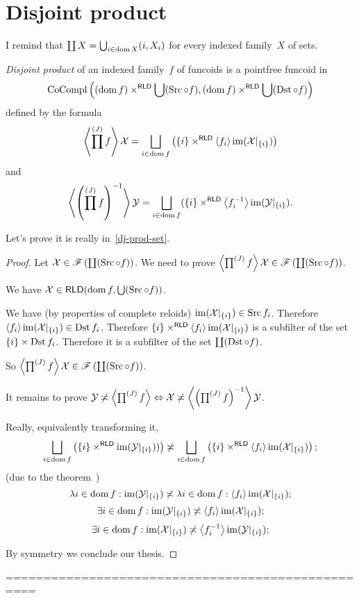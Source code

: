 \chapter{Disjoint product}

I remind that
$\coprod X = \bigcup_{i\in\operatorname{dom} X} (i,X_i)$
for every indexed family~$X$ of sets.

\begin{defn}
\emph{Disjoint product} of an indexed family~$f$ of funcoids is
a pointfree funcoid in
\begin{equation}\label{dj-prod-set}
\operatorname{CoCompl}\left((\operatorname{dom} f)\times^{\mathsf{RLD}}\bigcup(\operatorname{Src}\circ f), (\operatorname{dom} f)\times^{\mathsf{RLD}}\bigcup(\operatorname{Dst}\circ f)\right)
\end{equation}
defined by the formula
\[
\supfun{\prod^{(J)}f} \mathcal{X} =
\bigsqcup_{i\in\dom f}
\left(\{i\}\times^{\mathsf{RLD}}\supfun{f_i}\im(\mathcal{X}|_{\{i\}})\right)
\]
and
\[
\supfun{\left(\prod^{(J)}f\right)^{-1}} \mathcal{Y} =
\bigsqcup_{i\in\dom f}
(\{i\}\times^{\mathsf{RLD}}\supfun{f_i^{-1}}\im(\mathcal{Y}|_{\{i\}}).
\]
\end{defn}

Let's prove it is really in~\eqref{dj-prod-set}.

\begin{proof}
Let $\mathcal{X}\in\mathscr{F}\left(\coprod(\operatorname{Src}\circ f)\right)$.
We need to prove
$\left\langle \prod^{(J)}f\right\rangle \mathcal{X}\in\mathscr{F}\left(\coprod(\operatorname{Src}\circ f)\right)$.

We have $\mathcal{X}\in\mathsf{RLD}(\operatorname{dom} f, \bigcup(\operatorname{Src}\circ f))$.

We have (by properties of complete reloids) $\operatorname{im}(\mathcal{X}|_{\{i\}})\in\operatorname{Src} f_i$. Therefore $\left\langle f_i\right\rangle\operatorname{im}(\mathcal{X}|_{\{i\}})\in\operatorname{Dst} f_i$. Therefore
$\{i\}\times^{\mathsf{RLD}}\left\langle f_i\right\rangle\operatorname{im}(\mathcal{X}|_{\{i\}})$ is a subfilter of the set $\{i\}\times\operatorname{Dst} f_i$. Therefore it is a subfilter of the set $\coprod(\operatorname{Dst}\circ f)$.

So $\left\langle \prod^{(J)}f\right\rangle \mathcal{X}\in\mathscr{F}\left(\coprod(\operatorname{Src}\circ f)\right)$.

It remains to prove
$\mathcal{Y}\not\asymp\left\langle \prod^{(J)}f\right\rangle \Leftrightarrow
\mathcal{X}\not\asymp\left\langle \left(\prod^{(J)}f\right)^{-1}\right\rangle \mathcal{Y}$.

Really, equivalently transforming it, \[ \bigsqcup_{i\in\dom f}
\left(\{i\}\times^{\mathsf{RLD}}\im(\mathcal{Y}|_{\{i\}}))\right) \nasymp \bigsqcup_{i\in\dom f}
\left(\{i\}\times^{\mathsf{RLD}}\supfun{f_i}\im(\mathcal{X}|_{\{i\}})\right); \]
(due to the theorem~)
\[
\lambda i\in\operatorname{dom} f:\operatorname{im}(\mathcal{Y}|_{\{i\}}) \not\asymp
\lambda i\in\operatorname{dom} f:\left\langle f_i\right\rangle\operatorname{im}(\mathcal{X}|_{\{i\}});
\]
\[
\exists i\in\operatorname{dom} f:\operatorname{im}(\mathcal{Y}|_{\{i\}}) \not\asymp
\left\langle f_i\right\rangle\operatorname{im}(\mathcal{X}|_{\{i\}});
\]
\[
\exists i\in\operatorname{dom} f:\operatorname{im}(\mathcal{X}|_{\{i\}}) \not\asymp
\left\langle f_i^{-1}\right\rangle\operatorname{im}(\mathcal{Y}|_{\{i\}});
\]

By symmetry we conclude our thesis.
\end{proof}
==================================================


